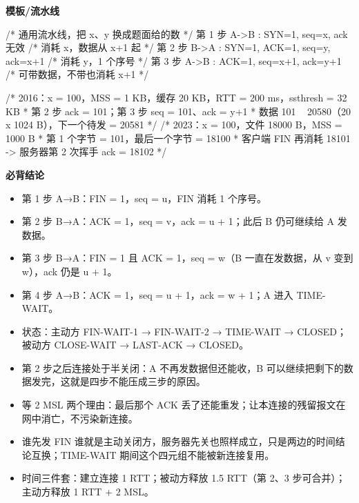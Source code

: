 \documentclass[10pt,a4paper]{ctexart}
\begin{document}
\textbf{模板/流水线}

\begin{codebox}
/* 通用流水线，把 x、y 换成题面给的数 */
第 1 步 A->B : SYN=1,            seq=x,   ack 无效    /* 消耗 x，数据从 x+1 起 */
第 2 步 B->A : SYN=1, ACK=1,     seq=y,   ack=x+1     /* 消耗 y，1 个序号 */
第 3 步 A->B : ACK=1,            seq=x+1, ack=y+1     /* 可带数据，不带也消耗 x+1 */

/* 2016：x = 100，MSS = 1 KB，缓存 20 KB，RTT = 200 ms，ssthresh = 32 KB
 * 第 2 步 ack = 101；第 3 步 seq = 101、ack = y+1
 * 数据 101 ~ 20580（20 x 1024 B），下一个待发 = 20581
 */
/* 2023：x = 100，文件 18000 B，MSS = 1000 B
 * 第 1 个字节 = 101，最后一个字节 = 18100
 * 客户端 FIN 再消耗 18101 -> 服务器第 2 次挥手 ack = 18102
 */
\end{codebox}




\textbf{必背结论}

\begin{itemize}

\item 第 1 步 A→B：FIN = 1，seq = u，FIN 消耗 1 个序号。

\item 第 2 步 B→A：ACK = 1，seq = v，ack = u + 1；此后 B 仍可继续给 A 发数据。

\item 第 3 步 B→A：FIN = 1 且 ACK = 1，seq = w（B 一直在发数据，从 v 变到 w），ack 仍是 u + 1。

\item 第 4 步 A→B：ACK = 1，seq = u + 1，ack = w + 1；A 进入 TIME-WAIT。

\item 状态：主动方 FIN-WAIT-1 → FIN-WAIT-2 → TIME-WAIT → CLOSED；被动方 CLOSE-WAIT → LAST-ACK → CLOSED。

\item 第 2 步之后连接处于半关闭：A 不再发数据但还能收，B 可以继续把剩下的数据发完，这就是四步不能压成三步的原因。

\item 等 2 MSL 两个理由：最后那个 ACK 丢了还能重发；让本连接的残留报文在网中消亡，不污染新连接。

\item 谁先发 FIN 谁就是主动关闭方，服务器先关也照样成立，只是两边的时间结论互换；TIME-WAIT 期间这个四元组不能被新连接复用。

\item 时间三件套：建立连接 1 RTT；被动方释放 1.5 RTT（第 2、3 步可合并）；主动方释放 1 RTT + 2 MSL。

\end{itemize}
\end{document}
